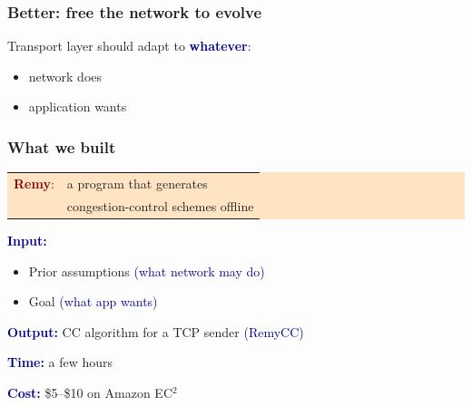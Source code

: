 \documentclass[svgnames]{beamer}
\newcommand{\ssline}{\vspace{8 pt}}
\begin{document}
\begin{frame}
\frametitle{Better: free the network to evolve}

\Large Transport layer should adapt to \textbf{\textcolor{DarkBlue}{whatever}}:

\begin{itemize}
\item network does

\item application wants

\end{itemize}

\end{frame}

\begin{frame}
\frametitle{What we built}

\colorbox{Bisque}{
\begin{centering}
\noindent \begin{tabular}{ll}
\Large \textcolor{DarkRed}{\bf Remy}: & \Large a program that generates \\ & \Large congestion-control schemes offline
\end{tabular}

\end{centering}}

\ssline
\ssline

\textcolor{DarkBlue}{\bf Input:}

\begin{itemize}
\item Prior assumptions \hspace{3.01 cm} \textcolor{DarkBlue}{(what network may do)}

\item Goal \hspace{5.275 cm}\textcolor{DarkBlue}{(what app wants)}
\end{itemize}

\textcolor{DarkBlue}{\bf Output:} CC algorithm for a TCP sender \hspace{0.177 cm}\textcolor{DarkBlue}{(RemyCC)}

\ssline

\textcolor{DarkBlue}{\bf Time:} a few hours

\ssline

\textcolor{DarkBlue}{\bf Cost:} \$5--\$10 on Amazon EC$^2$

\end{frame}
\end{document}
